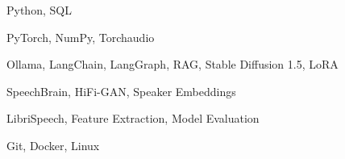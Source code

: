 
{Python, SQL}

{PyTorch, NumPy, Torchaudio}

{Ollama, LangChain, LangGraph, RAG, Stable Diffusion 1.5, LoRA}

{SpeechBrain, HiFi-GAN, Speaker Embeddings}

{LibriSpeech, Feature Extraction, Model Evaluation}

{Git, Docker, Linux}